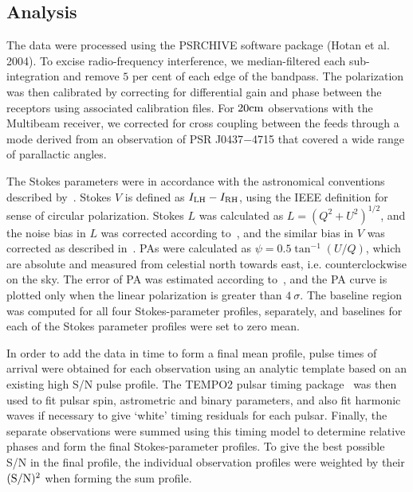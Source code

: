 \documentclass[useAMS,usenatbib]{mn2e}
\begin{document}
\subsection{Analysis}

The data were processed using the PSRCHIVE software package (Hotan et al. 2004). 
To excise radio-frequency interference, we median-filtered each sub-integration 
and remove $5$ per cent of each edge of the bandpass.
%
The polarization was then calibrated by correcting for differential gain and 
phase between the receptors using associated calibration files.
%
For $20\rm{cm}$ observations with the Multibeam receiver, we corrected for 
cross coupling between the feeds through a mode derived from an observation of 
PSR J0437$-$4715 that covered a wide range of parallactic angles.
%

The Stokes parameters were in accordance with the astronomical conventions described 
by~\citet{vanStraten10}. Stokes $V$ is defined as $I_{\rm{LH}}-I_{\rm{RH}}$, 
using the IEEE definition for sense of circular polarization. 
%
Stokes $L$ was calculated as $L=(Q^2+U^2)^{1/2}$, and the noise bias in $L$ 
was corrected according to~\citet{Lorimer05}, and the similar bias in 
$V$ was corrected as described in~\citet{Yan11}.
%
PAs were calculated as $\psi=0.5\tan^{-1}(U/Q)$, which are absolute 
and measured from celestial north towards east, i.e. counterclockwise on the sky.
%
The error of PA was estimated according to~\citet{Everett01}, and 
the PA curve is plotted only when the linear polarization is greater than 
$4\ \sigma$.
%
The baseline region was computed for all four Stokes-parameter profiles, separately, 
and baselines for each of the Stokes parameter profiles were set to zero mean.
%

In order to add the data in time to form a final mean profile, pulse times of arrival 
were obtained for each observation using an analytic template based on an existing 
high S/N pulse profile. The TEMPO2 pulsar timing package~\citep{Hobbs06}  
was then used to fit pulsar spin, astrometric and binary parameters, and also fit 
harmonic waves if necessary to give ‘white’ timing residuals for each pulsar. Finally, 
the separate observations were summed using this timing model to determine relative 
phases and form the final Stokes-parameter profiles. To give the best possible S/N 
in the final profile, the individual observation profiles were weighted by their
$(\rm{S/N})^2$ when forming the sum profile. 
\end{document}
